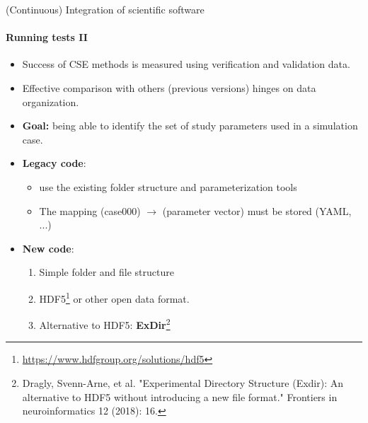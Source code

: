 \begin{frame}{(Continuous) Integration of scientific software} 
\framesubtitle{Running tests II}
\vfill

    \begin{itemize}
        \item Success of CSE methods is measured using verification and validation data. 
        \item Effective comparison with others (previous versions) hinges on data organization.
        \item \textbf{Goal:} being able to identify the set of study parameters used in a simulation case.
    \end{itemize}
    
    \vfill
    \begin{itemize}
        \item \textbf{Legacy code}: 
            \begin{itemize}
                \item use the existing folder structure and parameterization tools %
                \item The mapping (case000) $\to$ (parameter vector) must be stored (YAML, ...)
            \end{itemize}
        \item \textbf{New code}: 
            \begin{enumerate}
                \item Simple folder and file structure %
                \item HDF5\footnote{\url{https://www.hdfgroup.org/solutions/hdf5}} or other open data format.
                \item Alternative to HDF5: \textbf{ExDir}\footnote{Dragly, Svenn-Arne, et al. "Experimental Directory Structure (Exdir): An alternative to HDF5 without introducing a new file format." Frontiers in neuroinformatics 12 (2018): 16.} 
            \end{enumerate}
    \end{itemize}

\end{frame}

